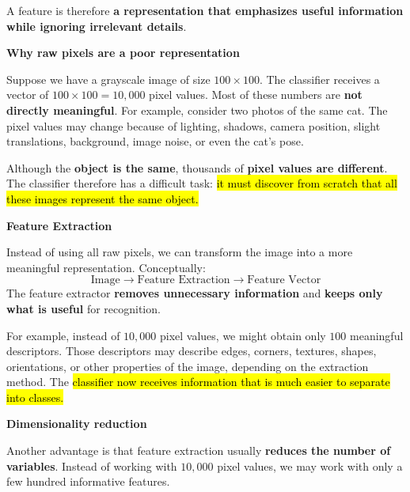 \highspace
A feature is therefore \textbf{a representation that emphasizes useful information while ignoring irrelevant details}.

\highspace
\begin{flushleft}
    \textcolor{Green3}{ \textbf{Why raw pixels are a poor representation}}
\end{flushleft}
Suppose we have a grayscale image of size $100 \times 100$. The classifier receives a vector of $100 \times 100 = 10,000$ pixel values. Most of these numbers are \textbf{not directly meaningful}. For example, consider two photos of the same cat. The pixel values may change because of lighting, shadows, camera position, slight translations, background, image noise, or even the cat's pose.

\highspace
Although the \textbf{object is the same}, thousands of \textbf{pixel values are different}. The classifier therefore has a difficult task: \hl{it must discover from scratch that all these images represent the same object.}

\highspace
\begin{flushleft}
    \textcolor{Green3}{ \textbf{Feature Extraction}}
\end{flushleft}
Instead of using all raw pixels, we can transform the image into a more meaningful representation. Conceptually:
\begin{equation*}
    \text{Image} \to \text{Feature Extraction} \to \text{Feature Vector}
\end{equation*}
The feature extractor \textbf{removes unnecessary information} and \textbf{keeps only what is useful} for recognition.

\highspace
For example, instead of $10,000$ pixel values, we might obtain only $100$ meaningful descriptors. Those descriptors may describe edges, corners, textures, shapes, orientations, or other properties of the image, depending on the extraction method. The \hl{classifier now receives information that is much easier to separate into classes.}

\highspace
\begin{flushleft}
    \textcolor{Green3}{ \textbf{Dimensionality reduction}}
\end{flushleft}
Another advantage is that feature extraction usually \textbf{reduces the number of variables}. Instead of working with $10,000$ pixel values, we may work with only a few hundred informative features.

